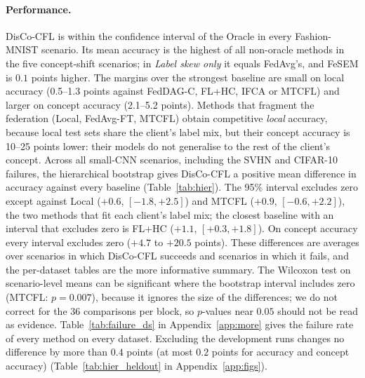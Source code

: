 \paragraph{Performance.} DisCo-CFL is within the confidence interval of the Oracle in every Fashion-MNIST scenario. Its mean accuracy is the highest of all non-oracle methods in the five concept-shift scenarios; in \emph{Label skew only} it equals FedAvg's, and FeSEM is $0.1$ points higher. The margins over the strongest baseline are small on local accuracy (0.5--1.3 points against FedDAG-C, FL+HC, IFCA or MTCFL) and larger on concept accuracy (2.1--5.2 points). Methods that fragment the federation (Local, FedAvg-FT, MTCFL) obtain competitive \emph{local} accuracy, because local test sets share the client's label mix, but their concept accuracy is 10--25 points lower: their models do not generalise to the rest of the client's concept. Across all small-CNN scenarios, including the SVHN and CIFAR-10 failures, the hierarchical bootstrap gives DisCo-CFL a positive mean difference in accuracy against every baseline (Table~\ref{tab:hier}). The 95\% interval excludes zero except against Local ($+0.6$, $[-1.8,+2.5]$) and MTCFL ($+0.9$, $[-0.6,+2.2]$), the two methods that fit each client's label mix; the closest baseline with an interval that excludes zero is FL+HC ($+1.1$, $[+0.3,+1.8]$). On concept accuracy every interval excludes zero ($+4.7$ to $+20.5$ points). These differences are averages over scenarios in which DisCo-CFL succeeds and scenarios in which it fails, and the per-dataset tables are the more informative summary. The Wilcoxon test on scenario-level means can be significant where the bootstrap interval includes zero (MTCFL: $p=0.007$), because it ignores the size of the differences; we do not correct for the 36 comparisons per block, so $p$-values near $0.05$ should not be read as evidence. Table~\ref{tab:failure_ds} in Appendix~\ref{app:more} gives the failure rate of every method on every dataset. Excluding the development runs changes no difference by more than $0.4$ points (at most $0.2$ points for accuracy and concept accuracy) (Table~\ref{tab:hier_heldout} in Appendix~\ref{app:figs}).

